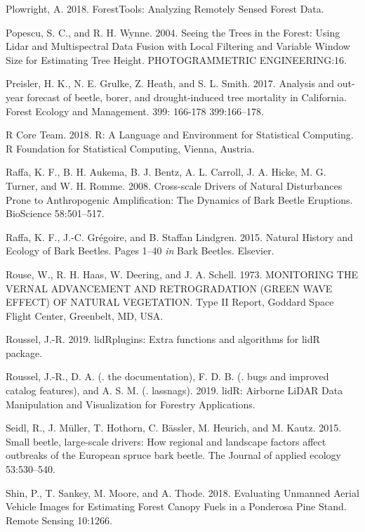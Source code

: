 \documentclass[]{article}
\begin{document}
\hypertarget{ref-plowright2018}{}
Plowright, A. 2018. ForestTools: Analyzing Remotely Sensed Forest Data.

\hypertarget{ref-popescu2004}{}
Popescu, S. C., and R. H. Wynne. 2004. Seeing the Trees in the Forest:
Using Lidar and Multispectral Data Fusion with Local Filtering and
Variable Window Size for Estimating Tree Height. PHOTOGRAMMETRIC
ENGINEERING:16.

\hypertarget{ref-preisler2017}{}
Preisler, H. K., N. E. Grulke, Z. Heath, and S. L. Smith. 2017. Analysis
and out-year forecast of beetle, borer, and drought-induced tree
mortality in California. Forest Ecology and Management. 399: 166-178
399:166--178.

\hypertarget{ref-rcoreteam2018}{}
R Core Team. 2018. R: A Language and Environment for Statistical
Computing. R Foundation for Statistical Computing, Vienna, Austria.

\hypertarget{ref-raffa2008}{}
Raffa, K. F., B. H. Aukema, B. J. Bentz, A. L. Carroll, J. A. Hicke, M.
G. Turner, and W. H. Romme. 2008. Cross-scale Drivers of Natural
Disturbances Prone to Anthropogenic Amplification: The Dynamics of Bark
Beetle Eruptions. BioScience 58:501--517.

\hypertarget{ref-raffa2015}{}
Raffa, K. F., J.-C. Grégoire, and B. Staffan Lindgren. 2015. Natural
History and Ecology of Bark Beetles. Pages 1--40 \emph{in} Bark Beetles.
Elsevier.

\hypertarget{ref-rouse1973}{}
Rouse, W., R. H. Haas, W. Deering, and J. A. Schell. 1973. MONITORING
THE VERNAL ADVANCEMENT AND RETROGRADATION (GREEN WAVE EFFECT) OF NATURAL
VEGETATION. Type II Report, Goddard Space Flight Center, Greenbelt, MD,
USA.

\hypertarget{ref-roussel2019a}{}
Roussel, J.-R. 2019. lidRplugins: Extra functions and algorithms for
lidR package.

\hypertarget{ref-roussel2019}{}
Roussel, J.-R., D. A. (. the documentation), F. D. B. (. bugs and
improved catalog features), and A. S. M. (. lassnags). 2019. lidR:
Airborne LiDAR Data Manipulation and Visualization for Forestry
Applications.

\hypertarget{ref-seidl2015}{}
Seidl, R., J. Müller, T. Hothorn, C. Bässler, M. Heurich, and M. Kautz.
2015. Small beetle, large-scale drivers: How regional and landscape
factors affect outbreaks of the European spruce bark beetle. The Journal
of applied ecology 53:530--540.

\hypertarget{ref-shin2018}{}
Shin, P., T. Sankey, M. Moore, and A. Thode. 2018. Evaluating Unmanned
Aerial Vehicle Images for Estimating Forest Canopy Fuels in a Ponderosa
Pine Stand. Remote Sensing 10:1266.
\end{document}
